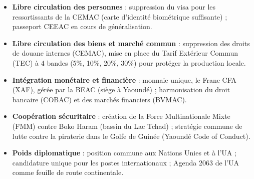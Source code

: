 \documentclass[11pt]{article}
\newcommand{\cle}[1]{{\popxbold\color{popdark}#1}}
\begin{document}
\begin{propriete}
\begin{itemize}
\item \textbf{Libre circulation des personnes} : suppression du visa pour les ressortissants de la CEMAC (carte d'identité biométrique suffisante) ; passeport CEEAC en cours de généralisation.
\item \textbf{Libre circulation des biens et marché commun} : suppression des droits de douane internes (CEMAC), mise en place du \cle{Tarif Extérieur Commun} (TEC) à 4 bandes (5\%, 10\%, 20\%, 30\%) pour protéger la production locale.
\item \textbf{Intégration monétaire et financière} : monnaie unique, le \cle{Franc CFA (XAF)}, gérée par la \cle{BEAC} (siège à Yaoundé) ; harmonisation du droit bancaire (COBAC) et des marchés financiers (BVMAC).
\item \textbf{Coopération sécuritaire} : création de la \cle{Force Multinationale Mixte (FMM)} contre Boko Haram (bassin du Lac Tchad) ; stratégie commune de lutte contre la piraterie dans le Golfe de Guinée (Yaoundé Code of Conduct).
\item \textbf{Poids diplomatique} : position commune aux Nations Unies et à l'UA ; candidature unique pour les postes internationaux ; Agenda 2063 de l'UA comme feuille de route continentale.
\end{itemize}
\end{propriete}
\end{document}
